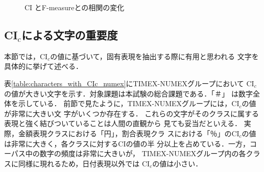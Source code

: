 \begin{figure}[tb]\small
\begin{center}
\end{center}
\caption{\label{figure:CI}CI とF-measureとの相関の変化}
\end{figure}



\subsection{CI$_c$による文字の重要度}

本節では，CI$_c$の値に基づいて，固有表現を抽出する際に有用と思われる
文字を具体的に挙げて述べる．

表\ref{table:characters_with_CIc_numex}にTIMEX-NUMEXグループにおいて
CI$_c$の値が大きい文字を示す．対象課題は本試験の総合課題である．「＃」
は数字全体を示している．
前節で見たように，TIMEX-NUMEXグループには，CI$_c$の値が非常に大きい文
字がいくつか存在する．
これらの文字がそのクラスに属する表現と強く結びついていることは人間の直観から
見ても妥当だといえる．
実際，金額表現クラスにおける「円」，割合表現クラ
スにおける「％」のCI$_c$の値は非常に大きく，各クラスに対するCIの値の半
分以上を占めている．一方，コーパス中の数字の頻度は非常に大きいが，
TIMEX-NUMEXグループ内の各クラスに同様に現れるため，日付表現以外では
CI$_c$の値は小さい．


